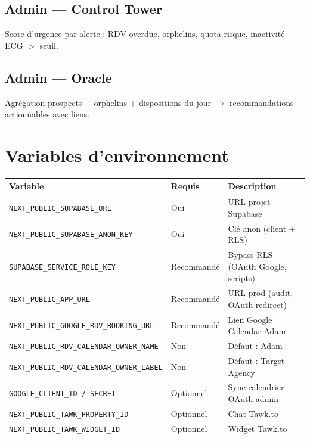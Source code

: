 \documentclass[11pt,a4paper]{report}
\begin{document}
\section{Admin --- Control Tower}
Score d'urgence par alerte : RDV overdue, orphelins, quota risque, inactivité ECG $>$ seuil.

\section{Admin --- Oracle}
Agrégation prospects + orphelins + dispositions du jour $\rightarrow$ recommandations actionnables avec liens.

\chapter{Variables d'environnement}

\begin{longtable}{@{}p{5.5cm}p{2cm}p{6.5cm}@{}}
\toprule
\textbf{Variable} & \textbf{Requis} & \textbf{Description} \\
\midrule
\endhead
\texttt{NEXT\_PUBLIC\_SUPABASE\_URL} & Oui & URL projet Supabase \\
\texttt{NEXT\_PUBLIC\_SUPABASE\_ANON\_KEY} & Oui & Clé anon (client + RLS) \\
\texttt{SUPABASE\_SERVICE\_ROLE\_KEY} & Recommandé & Bypass RLS (OAuth Google, scripts) \\
\texttt{NEXT\_PUBLIC\_APP\_URL} & Recommandé & URL prod (audit, OAuth redirect) \\
\texttt{NEXT\_PUBLIC\_GOOGLE\_RDV\_BOOKING\_URL} & Recommandé & Lien Google Calendar Adam \\
\texttt{NEXT\_PUBLIC\_RDV\_CALENDAR\_OWNER\_NAME} & Non & Défaut : Adam \\
\texttt{NEXT\_PUBLIC\_RDV\_CALENDAR\_OWNER\_LABEL} & Non & Défaut : Target Agency \\
\texttt{GOOGLE\_CLIENT\_ID / SECRET} & Optionnel & Sync calendrier OAuth admin \\
\texttt{NEXT\_PUBLIC\_TAWK\_PROPERTY\_ID} & Optionnel & Chat Tawk.to \\
\texttt{NEXT\_PUBLIC\_TAWK\_WIDGET\_ID} & Optionnel & Widget Tawk.to \\
\bottomrule
\end{longtable}

\end{document}
